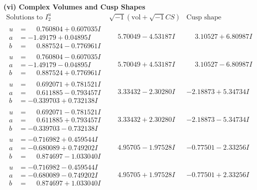 \documentclass[1p]{elsarticle_modified}
\theoremstyle{definition}
\newcommand{\I}{\sqrt{-1}}
\begin{document}
\newpage\flushleft \textbf{(vi) Complex Volumes and Cusp Shapes}
$$\begin{array}{c|c|c}  
\text{Solutions to }I^u_{2}& \I (\text{vol} + \sqrt{-1}CS) & \text{Cusp shape}\\
 \hline 
\begin{aligned}
u &= \phantom{-}0.760804 + 0.607035 I \\
a &= -1.49179 + 0.04895 I \\
b &= \phantom{-}0.887524 - 0.776961 I\end{aligned}
 & \phantom{-}5.70049 - 4.53187 I & \phantom{-}3.10527 + 6.80987 I \\ \hline\begin{aligned}
u &= \phantom{-}0.760804 - 0.607035 I \\
a &= -1.49179 - 0.04895 I \\
b &= \phantom{-}0.887524 + 0.776961 I\end{aligned}
 & \phantom{-}5.70049 + 4.53187 I & \phantom{-}3.10527 - 6.80987 I \\ \hline\begin{aligned}
u &= \phantom{-}0.692071 + 0.781521 I \\
a &= \phantom{-}0.611885 - 0.793457 I \\
b &= -0.339703 + 0.732138 I\end{aligned}
 & \phantom{-}3.33432 - 2.30280 I & -2.18873 + 5.34734 I \\ \hline\begin{aligned}
u &= \phantom{-}0.692071 - 0.781521 I \\
a &= \phantom{-}0.611885 + 0.793457 I \\
b &= -0.339703 - 0.732138 I\end{aligned}
 & \phantom{-}3.33432 + 2.30280 I & -2.18873 - 5.34734 I \\ \hline\begin{aligned}
u &= -0.716982 + 0.459544 I \\
a &= -0.680089 + 0.749202 I \\
b &= \phantom{-}0.874697 - 1.033040 I\end{aligned}
 & \phantom{-}4.95705 - 1.97528 I & -0.77501 - 2.33256 I \\ \hline\begin{aligned}
u &= -0.716982 - 0.459544 I \\
a &= -0.680089 - 0.749202 I \\
b &= \phantom{-}0.874697 + 1.033040 I\end{aligned}
 & \phantom{-}4.95705 + 1.97528 I & -0.77501 + 2.33256 I \\ \hline\begin{aligned}

\end{aligned}
\end{array}$$
\end{document}
